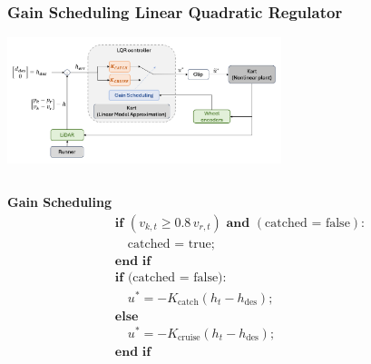 \documentclass[9pt, aspectratio=169]{beamer}
\begin{document}
\begin{frame}
\frametitle{Gain Scheduling Linear Quadratic Regulator}
\begin{center}
  	\includegraphics[width=0.6\textwidth]{LQR_scheme} 
\end{center}
\vspace{-0.1cm}
\begin{columns}

\begin{column}{0.4\textwidth}
\begin{block}{}
\centering
\textcolor{emph@Thesis}{\textbf{Gain Scheduling}} 
\begingroup
\setlength{\jot}{0.4ex}
\begin{equation*}
\begin{aligned}
	&\textbf{if} \,\, (v_{k,t} \geq 0.8 \, v_{r,t}) \,\, \textbf{and} \,\, (\text{catched = false}): \\
	& \quad \text{catched = true;} \\
	&\textbf{end if} \\
	&\textbf{if} \,\, \text{(catched = false):} \\
	& \quad u^* = - K_{\text{catch}} (h_t - h_{\text{des}}) ; \\
	&\textbf{else} \\
	& \quad u^* = - K_{\text{cruise}} (h_t - h_{\text{des}}); \\
	&\textbf{end if}
\end{aligned}
\end{equation*}
\endgroup
\end{block}
\end{column}


\end{columns}
\end{frame}
\end{document}
